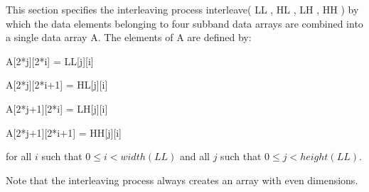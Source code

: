 This section specifies the interleaving process interleave( LL , HL , LH
, HH ) by which the data elements belonging to four subband data arrays
are combined into a single data array A. The elements of A are defined
by:

A[2*j][2*i] = LL[j][i]

A[2*j][2*i+1] = HL[j][i]

A[2*j+1][2*i] = LH[j][i]

A[2*j+1][2*i+1] = HH[j][i]

for all $i$ such that $0 \leq i < width(LL)$ and all $j$ such that
$0 \leq j < height(LL)$.

\begin{informative}
Note that the interleaving process always creates an array with even
dimensions.
\end{informative}


